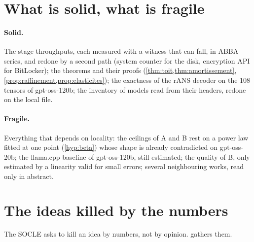 \section{What is solid, what is fragile}\label{sec:solide-fragile}

\paragraph{Solid.} The stage throughputs, each measured with a witness that can fall, in ABBA series, and redone by a second path (system counter for the disk, encryption API for BitLocker); the theorems and their proofs (\cref{thm:toit,thm:amortissement}, \cref{prop:raffinement,prop:elasticites}); the exactness of the rANS decoder on the 108 tensors of gpt-oss-120b; the inventory of models read from their headers, redone on the local file.

\paragraph{Fragile.} Everything that depends on locality: the ceilings of A and B rest on a power law fitted at one point (\cref{hyp:beta}) whose shape is already contradicted on gpt-oss-20b; the llama.cpp baseline of gpt-oss-120b, still estimated; the quality of B, only estimated by a linearity valid for small errors; several neighbouring works, read only in abstract.

\section{The ideas killed by the numbers}\label{sec:idees-tuees}

The SOCLE asks to kill an idea by numbers, not by opinion.  gathers them.

